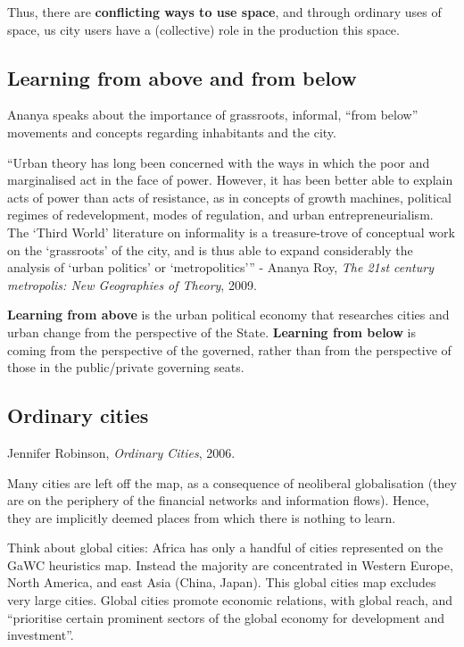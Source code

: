 \documentclass{article}
\begin{document}
Thus, there are \textbf{conflicting ways to use space}, and through ordinary uses of space, us city users have a (collective) role in the production this space.

\subsection{Learning from above and from below}

Ananya speaks about the importance of grassroots, informal, ``from below'' movements and concepts regarding inhabitants and the city.

``Urban theory has long been concerned with the ways in which the poor and marginalised act in the face of power. However, it has been better able to explain acts of power than acts of resistance, as in concepts of growth machines, political regimes of redevelopment, modes of regulation, and urban entrepreneurialism. The `Third World' literature on informality is a treasure-trove of conceptual work on the `grassroots' of the city, and is thus able to expand considerably the analysis of `urban politics' or `metropolitics''' - Ananya Roy, \textit{The 21st century metropolis: New Geographies of Theory}, 2009. 

\textbf{Learning from above} is the urban political economy that researches cities and urban change from the perspective of the State. 
\textbf{Learning from below} is coming from the perspective of the governed, rather than from the perspective of those in the public/private governing seats.

\subsection{Ordinary cities}

Jennifer Robinson, \textit{Ordinary Cities}, 2006.

Many cities are left off the map, as a consequence of neoliberal globalisation (they are on the periphery of the financial networks and information flows). Hence, they are implicitly deemed places from which there is nothing to learn.

Think about global cities: Africa has only a handful of cities represented on the GaWC heuristics map. Instead the majority are concentrated in Western Europe, North America, and east Asia (China, Japan). This global cities map excludes very large cities. Global cities promote economic relations, with global reach, and ``prioritise certain prominent sectors of the global economy for development and investment''.
\end{document}
